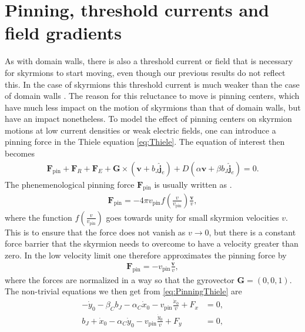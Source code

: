 \section{Pinning, threshold currents and field gradients}
As with domain walls, there is also a threshold current or field that is necessary for skyrmions to start moving, even though our previous results do not reflect this. In the case of skyrmions this threshold current is much weaker than the case of domain walls \cite{Jonietz2010}. The reason for this reluctance to move is pinning centers, which have much less impact on the motion of skyrmions than that of domain walls, but have an impact nonetheless. To model the effect of pinning centers on skyrmion motions at low current densities or weak electric fields, one can introduce a pinning force in the Thiele equation \eqref{eq:Thiele}. The equation of interest then becomes
\begin{align}
\label{eq:PinningThiele}
\mathbold{F}_{\textrm{pin}}+\mathbold{F}_R+\mathbold{F}_E + \mathbold{G} \times\left(\mathbold{v}+b_J\mathbold{\hat{j}}_e\right) + D\left(\alpha\mathbold{v}+\beta b_J \mathbold{\hat{j}}_e\right) = 0.
\end{align}
The phenemenological pinning force $\mathbold{F}_{\textrm{pin}}$ is usually written as \cite{Everschor2012, IwasakiNagaosa2013}.
\begin{align}
\mathbold{F}_{\textrm{pin}} = -4\pi v_{\textrm{pin}} f(\frac{v}{v_{\textrm{pin}}}) \frac{\mathbold{v}}{v},
\end{align}
where the function $f(\frac{v}{v_{\textrm{pin}}})$ goes towards unity for small skyrmion velocities $v$. This is to ensure that the force does not vanish as $v\rightarrow 0$, but there is a constant force barrier that the skyrmion needs to overcome to have a velocity greater than zero. In the low velocity limit one therefore approximates the pinning force by
\begin{align}
\mathbold{F}_{\textrm{pin}} = - v_{\textrm{pin}} \frac{\mathbold{v}}{v},
\end{align}
where the forces are normalized in a way so that the gyrovector $\mathbold{G} = (0, 0, 1)$. The non-trivial equations we then get from \eqref{eq:PinningThiele} are
\begin{subequations}
\label{eq:PinningThieleComponents}
\begin{align}
\label{eq:PinningThieleA}
-\dot{y}_0 - \beta_Cb_J - \alpha_C\dot{x}_0 - v_{\textrm{pin}}\frac{\dot{x}_0}{v} + F_x &= 0, \\
\label{eq:PinningThieleB}
b_J + \dot{x}_0 - \alpha_C\dot{y}_0 - v_{\textrm{pin}}\frac{\dot{y}_0}{v} + F_y &= 0,
\end{align}
\end{subequations}
